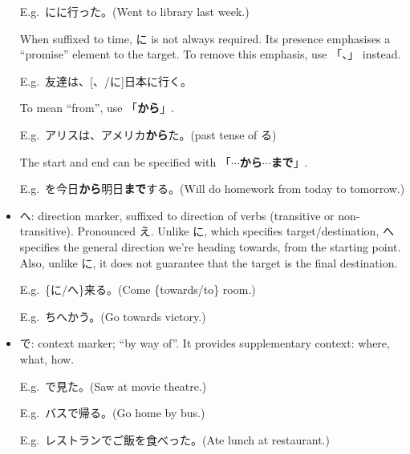 \documentclass[../nihongo-gakushuu-kyouzai.tex]{subfiles}
\begin{document}
\begin{itemize}
    E.g.\ にに行った。(Went to library last week.)

    When suffixed to time, に is not always required. Its presence emphasises a ``promise'' element to the target. To remove this emphasis, use 「、」 instead.

    E.g.\ 友達は、[、/に]日本に行く。

    To mean ``from'', use 「\textbf{から}」.

    E.g.\ アリスは、アメリカ\textbf{から}た。(past tense of る)

    The start and end can be specified with 「\textbf{$\cdots$から$\cdots$まで}」.

    E.g.\ を今日\textbf{から}明日\textbf{まで}する。(Will do homework from today to tomorrow.)

    \item へ: direction marker, suffixed to direction of verbs (transitive or non-transitive). Pronounced え. Unlike に, which specifies target/destination, へ specifies the general direction we're heading towards, from the starting point. Also, unlike に, it does not guarantee that the target is the final destination. 

    E.g.\ \{に/へ\}来る。(Come \{towards/to\} room.)

    E.g.\ ちへかう。(Go towards victory.)
    \item で: context marker; ``by way of''. It provides supplementary context: where, what, how.

    E.g.\ で見た。(Saw at movie theatre.)

    E.g.\ バスで帰る。(Go home by bus.)

    E.g.\ レストランでご飯を食べった。(Ate lunch at restaurant.)
\end{itemize}
\end{document}
